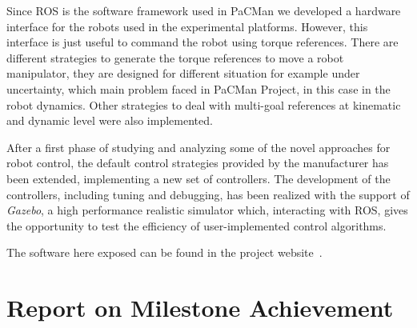 \documentclass[a4paper,11pt,pdf]{pacmanreport}
\begin{document}
Since ROS is the software framework used in PaCMan we developed a hardware interface for the robots used in the experimental platforms. However, this interface is just useful to command the robot using torque references. There are different strategies to generate the torque references to move a robot manipulator, they are designed for different situation for example under uncertainty, which main problem faced in PaCMan Project, in this case in the robot dynamics. Other strategies to deal with multi-goal references at kinematic and dynamic level were also implemented.




After a first phase of studying and analyzing some of the novel approaches for robot control, the default control strategies provided by the manufacturer has been extended, implementing a new set of controllers.
The development of the controllers, including tuning and debugging, has been realized with the support of \textit{Gazebo}, a high performance realistic simulator which, interacting with ROS, gives the opportunity to test the efficiency of user-implemented control algorithms. 



The software here exposed can be found in the project website~\cite{PACMAN_software}.


\section{Report on Milestone Achievement}
\end{document}
